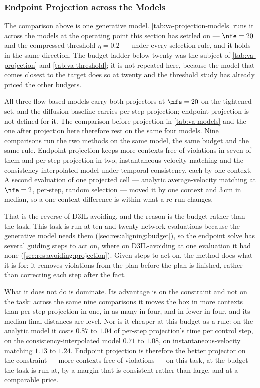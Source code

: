 \subsubsection{Endpoint Projection across the Models}\label{sec:res:aligning:projection:models}

The comparison above is one generative model. \autoref{tab:va-projection-models} runs it across the
models at the operating point this section has settled on --- $\nfe=20$ and the compressed threshold
$\eta=0.2$ --- under every selection rule, and it holds in the same direction. The budget ladder below
twenty was the subject of \autoref{tab:va-projection} and \autoref{tab:va-threshold}; it is not repeated
here, because the model that comes closest to the target does so at twenty and the threshold study has already priced
the other budgets.

All three flow-based models carry both projectors at $\nfe=20$ on the tightened set, and the diffusion
baseline carries per-step projection; endpoint projection is not defined for it. The comparison before
projection in \autoref{tab:va-models} and the one after projection here therefore rest on the same four
models.
Nine comparisons run the two methods on the same model, the same budget and the same rule. Endpoint
projection keeps more contexts free of violations in seven of them and per-step projection in two,
instantaneous-velocity matching and the consistency-interpolated model under temporal consistency, each by
one context. A second evaluation of one projected cell --- analytic average-velocity matching at
$\nfe=2$, per-step, random selection --- moved it by one context and $3$\,cm in median, so a one-context
difference is within what a re-run changes.

That is the reverse of D3IL-avoiding, and the reason is the budget rather than the task. This task is
run at ten and twenty network evaluations because the generative model needs them
(\autoref{sec:res:aligning:budget}), so the endpoint solve has several guiding steps to act on, where on
D3IL-avoiding at one evaluation it had none (\autoref{sec:res:avoiding:projection}). Given steps to act
on, the method does what it is for: it removes violations from the plan before the plan is finished,
rather than correcting each step after the fact.

What it does not do is dominate. Its advantage is on the constraint and not on the task: across the same
nine comparisons it moves the box in more contexts than per-step projection in one, in as many in four,
and in fewer in four, and its median final distances are level. Nor is it cheaper at this budget as a
rule: on the analytic model it costs $0.87$ to $1.04$ of per-step projection's time per control step, on
the consistency-interpolated model $0.71$ to $1.08$, on instantaneous-velocity matching $1.13$ to $1.24$.
Endpoint projection is therefore the better projector on the constraint --- more contexts free of violations --- on this task, at the budget the
task is run at, by a margin that is consistent rather than large, and at a comparable price.

